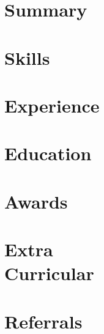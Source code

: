 \documentclass[a4paper]{resume}
\begin{document}
\def \sepspace {\vspace{1em}}
\makeheader{\contactphone}{\contactemail}{\contactwebsite}
\section{Summary}{\small \objective}
\section{Skills}{\skillstechnical}
\section{Experience}{\experience}
\section{Education}{\education}
\section{Awards}{\awards}
\section{Extra\\Curricular}{\extracurricular}
\section{Referrals}{}
\end{document}

